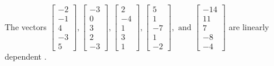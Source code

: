 \begin{exercise}
\begin{exerciseStatement}
  \end{exerciseStatement}
  \begin{exerciseAnswer}
   The vectors \(\left[\begin{array}{r}
-2 \\
-1 \\
4 \\
-3 \\
5
\end{array}\right] , \left[\begin{array}{r}
-3 \\
0 \\
3 \\
2 \\
-3
\end{array}\right] , \left[\begin{array}{r}
2 \\
-4 \\
1 \\
3 \\
1
\end{array}\right] , \left[\begin{array}{r}
5 \\
1 \\
-7 \\
1 \\
-2
\end{array}\right] , \text{ and } \left[\begin{array}{r}
-14 \\
11 \\
7 \\
-8 \\
-4
\end{array}\right]\) are 
  	 linearly dependent  .
  


  \end{exerciseAnswer}
\end{exercise}